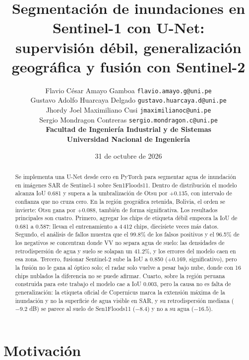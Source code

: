 \documentclass{article}
\title{Segmentación de inundaciones en Sentinel-1 con U-Net:\\
       supervisión débil, generalización geográfica y fusión con Sentinel-2}
\author{%
  Flavio César Amayo Gamboa \quad \texttt{flavio.amayo.g@uni.pe} \\
  Gustavo Adolfo Huarcaya Delgado \quad \texttt{gustavo.huarcaya.d@uni.pe} \\
  Jhordy Joel Maximiliano Cusi \quad \texttt{jmaximilianoc@uni.pe} \\
  Sergio Mondragon Contreras \quad \texttt{sergio.mondragon.c@uni.pe} \\[0.6em]
  \textbf{Facultad de Ingeniería Industrial y de Sistemas} \\
  \textbf{Universidad Nacional de Ingeniería}
}
\date{31 de octubre de 2026}
\begin{document}
\maketitle

\vspace{-2em}

\begin{abstract}
Se implementa una U-Net desde cero en PyTorch para segmentar agua de inundación
en imágenes SAR de Sentinel-1 sobre Sen1Floods11. Dentro de distribución el
modelo alcanza IoU 0.681 y supera a la umbralización de Otsu por $+0.135$, con
intervalo de confianza que no cruza cero. En la región geográfica retenida,
Bolivia, el orden se invierte: Otsu gana por $+0.088$, también de forma
significativa. Los resultados principales son cuatro.
Primero, agregar los chips de etiqueta débil empeora la IoU de 0.681 a 0.587:
llevan el entrenamiento a 4\,412 chips, diecisiete veces más datos. Segundo, el
análisis de fallos muestra que el 99.8\% de los falsos positivos y el 96.5\% de
los negativos se concentran donde VV no separa agua de suelo: las densidades de
retrodispersión de agua y suelo se solapan un 41.2\%, y los errores del modelo
caen en esa zona. Tercero, fusionar Sentinel-2 sube la IoU a 0.850 ($+0.169$,
significativo), pero la fusión no le gana al óptico solo; el radar solo vuelve a
pesar bajo nube, donde con 16 chips nublados la diferencia no se puede afirmar.
Cuarto, sobre la
región peruana construida para este trabajo el modelo cae a IoU 0.003, pero la
causa no es falta de generalización: la etiqueta oficial de Copernicus marca la
extensión máxima de la inundación y no la superficie de agua visible en SAR, y su
retrodispersión mediana ($-9.2$
dB) se parece al suelo de Sen1Floods11 ($-8.4$) y no a su agua ($-16.5$).
\end{abstract}

\vspace{-2em}

\section{Motivación}
\end{document}
